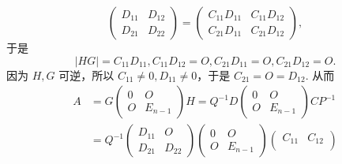 \begin{exercise}
\begin{exgroup}
\begin{answer}
\begin{enumerate}
\begin{enumerate}
\[\begin{pmatrix}
                                        D_{11} & D_{12} \\
                                        D_{21} & D_{22}
                                    \end{pmatrix} = \begin{pmatrix}
                                        C_{11}D_{11} & C_{11}D_{12} \\
                                        C_{21}D_{11} & C_{21}D_{12}
                                    \end{pmatrix},\]
                                于是
                                \[\lvert HG \rvert = C_{11}D_{11}, C_{11}D_{12} = O, C_{21}D_{11} = O, C_{21}D_{12} = O.\]
                                因为 $H, G$ 可逆，所以 $C_{11} \neq 0, D_{11} \neq 0$，于是 $C_{21} = O = D_{12}$. 从而
                                \begin{align*}
                                    A & = G\begin{pmatrix}
                                               0 & O       \\
                                               O & E_{n-1}
                                           \end{pmatrix}H
                                    = Q^{-1}D\begin{pmatrix}
                                                 0 & O       \\
                                                 O & E_{n-1}
                                             \end{pmatrix}CP^{-1}      \\
                                      & = Q^{-1}\begin{pmatrix}
                                                    D_{11} & O      \\
                                                    D_{21} & D_{22}
                                                \end{pmatrix}
                                    \begin{pmatrix}
                                        0 & O       \\
                                        O & E_{n-1}
                                    \end{pmatrix}
                                    \begin{pmatrix}
                                        C_{11} & C_{12} \\

\end{pmatrix}
\end{align*}
\end{enumerate}
\end{enumerate}
\end{answer}
\end{exgroup}
\end{exercise}
